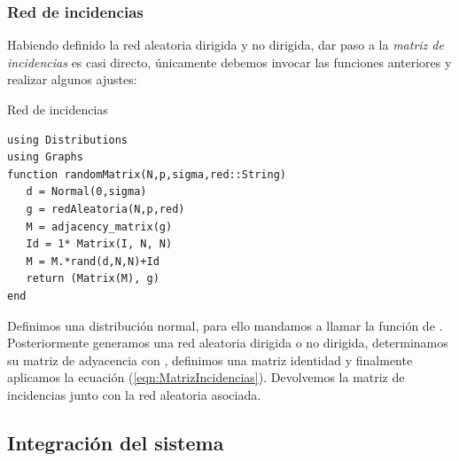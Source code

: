 \subsubsection{Red de incidencias}\label{sec:redIncidencias}

Habiendo definido la red aleatoria dirigida y no dirigida, dar paso a la \textit{matriz de incidencias} es casi directo, únicamente debemos invocar las funciones anteriores y realizar algunos ajustes:
\begin{algorithm}
	\label{al:redIncidencias}
	\caption{Red de incidencias}
	\begin{verbatim}
using Distributions
using Graphs
function randomMatrix(N,p,sigma,red::String)
   d = Normal(0,sigma)
   g = redAleatoria(N,p,red)
   M = adjacency_matrix(g)
   Id = 1* Matrix(I, N, N)
   M = M.*rand(d,N,N)+Id
   return (Matrix(M), g)
end
	\end{verbatim}
\end{algorithm}

Definimos una distribución normal, para ello mandamos a llamar la función  de . Posteriormente generamos una red aleatoria dirigida o no dirigida, determinamos su matriz de adyacencia con , definimos una matriz identidad  y finalmente aplicamos la ecuación (\ref{eqn:MatrizIncidencias}). Devolvemos la matriz de incidencias junto con la red aleatoria asociada.

\subsection{Integración del sistema}\label{sec:poblacionesLK}

